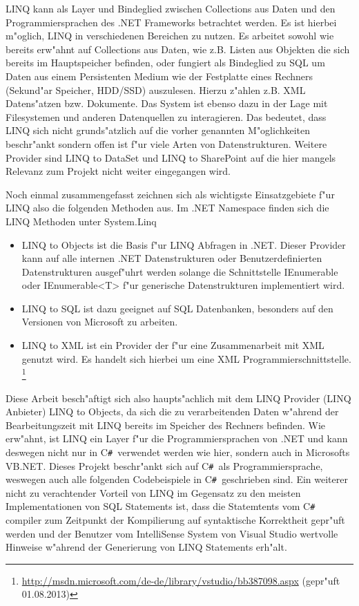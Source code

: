 \documentclass[pagesize, paper=a4, fontsize=12pt,titlepage=true, headings=small, headnosepline, abstractoff, liststotoc, nochapterprefix, plainheadsepline]{scrreprt}
\newcommand{\CSS}{C\texttt{\# }}
\begin{document}
LINQ kann als Layer und Bindeglied zwischen Collections aus Daten und den Programmiersprachen des .NET Frameworks betrachtet werden. Es ist hierbei m"oglich, LINQ in verschiedenen Bereichen zu nutzen. Es arbeitet sowohl wie bereits erw"ahnt auf Collections aus Daten, wie z.B. Listen aus Objekten die sich bereits im Hauptspeicher befinden, oder fungiert als Bindeglied zu SQL um Daten aus einem Persistenten Medium wie der Festplatte eines Rechners (Sekund"ar Speicher, HDD/SSD) auszulesen. Hierzu z"ahlen z.B. XML Datens"atzen bzw. Dokumente. Das System ist ebenso dazu in der Lage mit Filesystemen und anderen Datenquellen zu interagieren. Das bedeutet, dass LINQ sich nicht grunds"atzlich auf die vorher genannten M"oglichkeiten beschr"ankt sondern offen ist f"ur viele Arten von Datenstrukturen. Weitere Provider sind LINQ to DataSet und LINQ to SharePoint auf die hier mangels Relevanz zum Projekt nicht weiter eingegangen wird.
\newline

Noch einmal zusammengefasst zeichnen sich als wichtigste Einsatzgebiete f"ur LINQ also die folgenden Methoden aus. Im .NET Namespace finden sich die LINQ Methoden unter System.Linq
\begin{itemize}
\item LINQ to Objects ist die Basis f"ur LINQ Abfragen in .NET. Dieser Provider kann auf alle internen .NET Datenstrukturen oder Benutzerdefinierten Datenstrukturen ausgef"uhrt werden solange die Schnittstelle IEnumerable oder IEnumerable<T> f"ur generische Datenstrukturen implementiert wird.
\item LINQ to SQL ist dazu geeignet auf SQL Datenbanken, besonders auf den Versionen von Microsoft zu arbeiten.
\item LINQ to XML ist ein Provider der f"ur eine Zusammenarbeit mit XML genutzt wird. Es handelt sich hierbei um eine XML Programmierschnittstelle. \cite{MicrosoftCReferenz.2013} \footnote{\url{http://msdn.microsoft.com/de-de/library/vstudio/bb387098.aspx} (gepr"uft 01.08.2013)}
\end{itemize}

Diese Arbeit besch"aftigt sich also haupts"achlich mit dem LINQ Provider (LINQ Anbieter) LINQ to Objects, da sich die zu verarbeitenden Daten w"ahrend der Bearbeitungszeit mit LINQ bereits im Speicher des Rechners befinden. Wie erw"ahnt, ist LINQ ein Layer f"ur die Programmiersprachen von .NET und kann deswegen nicht nur in \CSS verwendet werden wie hier, sondern auch in Microsofts VB.NET. Dieses Projekt beschr"ankt sich auf \CSS als Programmiersprache, weswegen auch alle folgenden Codebeispiele in \CSS geschrieben sind. Ein weiterer nicht zu verachtender Vorteil von LINQ im Gegensatz zu den meisten Implementationen von SQL Statements ist, dass die Statemtents vom \CSS compiler zum Zeitpunkt der Kompilierung auf syntaktische Korrektheit gepr"uft werden und der Benutzer vom IntelliSense System von Visual Studio wertvolle Hinweise w"ahrend der Generierung von LINQ Statements erh"alt.
\end{document}
